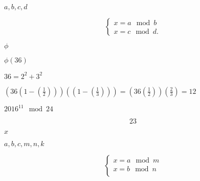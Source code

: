 \documentclass[10pt]{book}
\begin{document}
\begin{mdSnippets}
\begin{mdInlineSnippet}
$a, b, c, d$\end{mdInlineSnippet}%
\begin{mdDisplaySnippet}[9ddaf010c06ad75e29c04815c282e105]%
\[%
\left\{\begin{array}{l}
x = a \mod b\\
x = c \mod d.
\end{array}\right.
\]%
\end{mdDisplaySnippet}%
\begin{mdInlineSnippet}[1ed346930917426bc46d41e22cc525ec]%
$\phi$\end{mdInlineSnippet}%
\begin{mdInlineSnippet}[d80df8daca17b91b658266cd0106e416]%
$\phi(36)$\end{mdInlineSnippet}%
\begin{mdInlineSnippet}[e94162e52281039d65d29c87b51c61d2]%
$36 = 2^2 + 3^2$\end{mdInlineSnippet}%
\begin{mdInlineSnippet}[85c00d666a8029c8369161ee63c0ccd9]%
$\left(36\left(1 - \left(\frac{1} {2}\right)\right)\right) \left(\left(1 - \left(\frac{1} {3}\right)\right)\right) = \left(36\left(\frac{1} {2} \right)\right) \left(\frac{2} {3} \right) = 12$\end{mdInlineSnippet}%
\begin{mdInlineSnippet}%
$2016^{11} \mod 24$\end{mdInlineSnippet}%
\begin{mdDisplaySnippet}%
\[%
  23
\]%
\end{mdDisplaySnippet}%
\begin{mdInlineSnippet}[9dd4e461268c8034f5c8564e155c67a6]%
$x$\end{mdInlineSnippet}%
\begin{mdInlineSnippet}%
$a,b,c,m,n,k$\end{mdInlineSnippet}%
\begin{mdDisplaySnippet}[5552910c2be0f81d5df1a44fbea473e8]%
\[%
\left\{\begin{array}{l}
x = a \mod m\\
x = b \mod n\\

\end{array}\]
\end{mdDisplaySnippet}
\end{mdSnippets}
\end{document}
